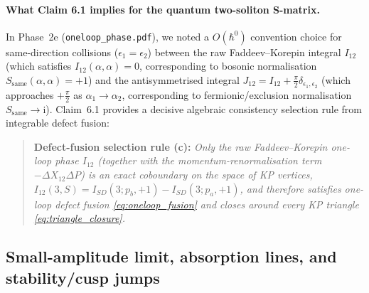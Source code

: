 \documentclass[11pt,a4paper]{article}
\newcommand{\ii}{\mathrm{i}}
\newcommand{\hb}{\hbar}
\begin{document}
\paragraph{What Claim 6.1 implies for the quantum two-soliton S-matrix.}
In Phase~2e (\texttt{oneloop\_phase.pdf}), we noted a $O(\hb^0)$ convention choice
for same-direction collisions ($\epsilon_1 = \epsilon_2$) between the raw
Faddeev--Korepin integral $I_{12}$ (which satisfies $I_{12}(\alpha,\alpha) = 0$,
corresponding to bosonic normalisation $S_{\mathrm{same}}(\alpha,\alpha) = +1$)
and the antisymmetrised integral $J_{12} = I_{12} + \frac{\pi}{2}\delta_{\epsilon_1,\epsilon_2}$
(which approaches $+\frac{\pi}{2}$ as $\alpha_1 \to \alpha_2$, corresponding to
fermionic/exclusion normalisation $S_{\mathrm{same}} \to \ii$). Claim~6.1
provides a decisive algebraic consistency selection rule from integrable defect
fusion:
\begin{quote}
\textbf{Defect-fusion selection rule \textbf{(c)}:} \emph{Only the raw
Faddeev--Korepin one-loop phase $I_{12}$ (together with the momentum-renormalisation
term $-\Delta X_{12}\Delta P$) is an exact coboundary on the space of KP vertices,
$I_{12}(3,S) = I_{SD}(3;p_b,+1) - I_{SD}(3;p_a,+1)$, and therefore satisfies
one-loop defect fusion \eqref{eq:oneloop_fusion} and closes around every KP
triangle \eqref{eq:triangle_closure}.}
\end{quote}

\subsection{Small-amplitude limit, absorption lines, and stability/cusp jumps}
\end{document}
